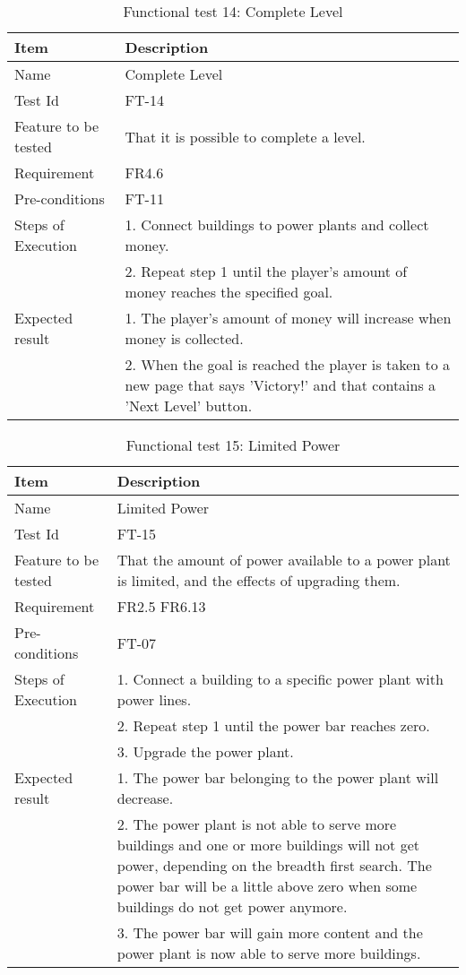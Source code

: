 \begin{table}[H]
\centering
	\begin{tabular}{ l | p{8cm} }
		\hline
		\rowcolor{lightgray}
		{\bf Item} & {\bf Description} \\ \hline
		Name & Complete Level \\ 
		Test Id & FT-14 \\ 
		Feature to be tested & That it is possible to complete a level. \\ 
		Requirement & FR4.6 \\ 
		Pre-conditions & FT-11 \\ 
		Steps of Execution & 1. Connect buildings to power plants and collect money. \\ 
		& 2. Repeat step 1 until the player's amount of money reaches the specified goal. \\
		Expected result & 1. The player's amount of money will increase when money is collected. \\ 
		& 2. When the goal is reached the player is taken to a new page that says 'Victory!' and that contains 
		a 'Next Level' button. \\
		\hline
	\end{tabular}
	\caption{Functional test 14: Complete Level}
\end{table}

\begin{table}[H]
\centering
	\begin{tabular}{ l | p{8cm} }
		\hline
		\rowcolor{lightgray}
		{\bf Item} & {\bf Description} \\ \hline
		Name & Limited Power \\ 
		Test Id & FT-15 \\ 
		Feature to be tested & That the amount of power available to a power plant is limited, and the effects of upgrading them. \\ 
		Requirement & FR2.5 FR6.13 \\ 
		Pre-conditions & FT-07 \\ 
		Steps of Execution & 1. Connect a building to a specific power plant with power lines. \\
		& 2. Repeat step 1 until the power bar reaches zero. \\
		& 3. Upgrade the power plant. \\
		Expected result & 1. The power bar belonging to the power plant will decrease. \\
		& 2. The power plant is not able to serve more buildings and one or more buildings will not get power, depending on the breadth first search. The power bar will be a little above zero when some buildings do not get power anymore. \\ 
		& 3. The power bar will gain more content and the power plant is now able to serve more buildings. \\
		\hline
	\end{tabular}
	\caption{Functional test 15: Limited Power}
\end{table}

